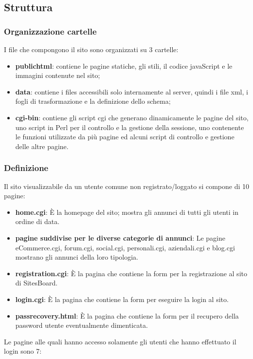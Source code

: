 \documentclass[12pt]{article}
\begin{document}
	\subsection{Struttura}
		\subsubsection{Organizzazione cartelle}
		
		I file che compongono il sito sono organizzati su 3 cartelle:

		\begin{itemize}

			\item \textbf{public\textunderscore html}: contiene le pagine statiche, gli stili, il codice javaScript e le immagini contenute nel sito;
			\item \textbf{data}: contiene i files accessibili solo internamente al server, quindi i file xml, i fogli di trasformazione e la definizione dello schema;
			\item \textbf{cgi-bin}: contiene gli script cgi che generano dinamicamente le pagine del sito, uno script in Perl per il controllo e la gestione della sessione, uno contenente le funzioni utilizzate da più pagine ed alcuni script di controllo e gestione delle altre pagine.

		\end{itemize}


		\subsubsection{Definizione}
	
		Il sito visualizzabile da un utente comune non registrato/loggato si compone di 10 pagine:
		
		\begin{itemize}
			\item \textbf{home.cgi}: È la homepage del sito; mostra gli annunci di tutti gli utenti in ordine di data.
			\item \textbf{pagine suddivise per le diverse categorie di annunci}: Le pagine eCommerce.cgi, forum.cgi, social.cgi, personali.cgi, aziendali.cgi e blog.cgi mostrano gli annunci della loro tipologia.
			\item \textbf{registration.cgi}: È la pagina che contiene la form per la registrazione al sito di SitesBoard.
			\item \textbf{login.cgi}: È la pagina che contiene la form per eseguire la login al sito.
			\item \textbf{pass\textunderscore recovery.html}: È la pagina che contiene la form per il recupero della password utente eventualmente dimenticata.\\
		\end{itemize}
		Le pagine alle quali hanno accesso solamente gli utenti che hanno effettuato il login sono 7:
		
\end{document}
